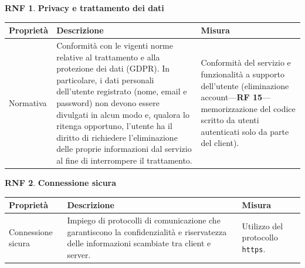 \documentclass[11pt, a4paper]{article}
\theoremstyle{definition} %
\newtheorem{nonfuncreq}{RNF} %
\begin{document}
\begin{nonfuncreq}
    \textbf{Privacy e trattamento dei dati }
    \begin{center}
        \footnotesize
        \begin{tabularx}{\textwidth}{|X||X||X|}
            \hline
            \cellcolor{red!70}Proprietà & \cellcolor{red!70}Descrizione & \cellcolor{red!70}Misura\\
            \hline
            Normativa & Conformità con le vigenti norme relative al trattamento e alla protezione dei dati (GDPR). In particolare, i dati personali dell'utente registrato (nome, email e password) non devono essere divulgati in alcun modo e, qualora lo ritenga opportuno, l'utente ha il diritto di richiedere l'eliminazione delle proprie informazioni dal servizio al fine di interrompere il trattamento. & Conformità del servizio e funzionalità a supporto dell'utente (eliminazione account—\textbf{RF 15}—memorizzazione del codice scritto da utenti autenticati solo da parte del client).\\
            \hline
        \end{tabularx}
    \end{center}
\end{nonfuncreq}

\begin{nonfuncreq}
    \textbf{Connessione sicura }
    \begin{center}
        \footnotesize
        \begin{tabularx}{\textwidth}{|X||X||X|}
            \hline
            \cellcolor{red!70}Proprietà & \cellcolor{red!70}Descrizione & \cellcolor{red!70}Misura\\
            \hline
            Connessione sicura & Impiego di protocolli di comunicazione che garantiscono la confidenzialità e riservatezza delle informazioni scambiate tra client e server. & Utilizzo del protocollo \texttt{https}.\\
            \hline
        \end{tabularx}
    \end{center}
\end{nonfuncreq}
\end{document}
